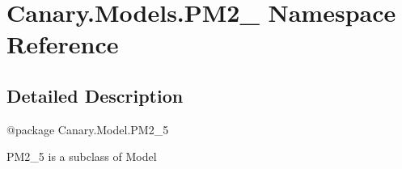 \hypertarget{namespace_canary_1_1_models_1_1_p_m2__5}{\section{Canary.\-Models.\-P\-M2\-\_ Namespace Reference}
\label{namespace_canary_1_1_models_1_1_p_m2__5}
}


\subsection{Detailed Description}
\begin{DoxyVerb}@package Canary.Model.PM2_5

PM2_5 is a subclass of Model
\end{DoxyVerb}
 